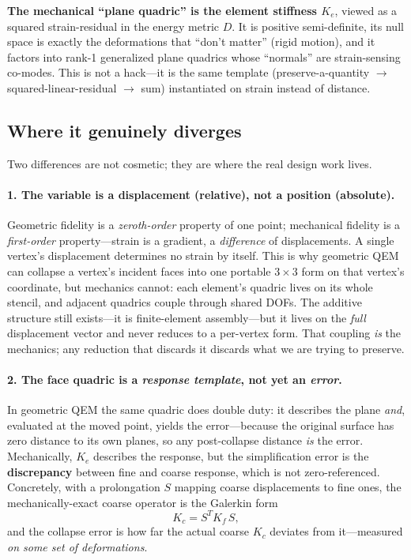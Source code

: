 \noindent\textbf{The mechanical ``plane quadric'' is the element stiffness $K_e$}, viewed as a squared strain-residual in the energy metric $D$.
It is positive semi-definite, its null space is exactly the deformations that ``don't matter'' (rigid motion), and it factors into rank-1 generalized plane quadrics whose ``normals'' are strain-sensing co-modes.
This is not a hack---it is the same template (preserve-a-quantity $\rightarrow$ squared-linear-residual $\rightarrow$ sum) instantiated on strain instead of distance.

\subsection{Where it genuinely diverges}

Two differences are not cosmetic; they are where the real design work lives.

\paragraph{1. The variable is a displacement (relative), not a position (absolute).}
Geometric fidelity is a \emph{zeroth-order} property of one point; mechanical fidelity is a \emph{first-order} property---strain is a gradient, a \emph{difference} of displacements.
A single vertex's displacement determines no strain by itself.
This is why geometric QEM can collapse a vertex's incident faces into one portable $3\times3$ form on that vertex's coordinate, but mechanics cannot: each element's quadric lives on its whole stencil, and adjacent quadrics couple through shared DOFs.
The additive structure still exists---it is finite-element assembly---but it lives on the \emph{full} displacement vector and never reduces to a per-vertex form.
That coupling \emph{is} the mechanics; any reduction that discards it discards what we are trying to preserve.

\paragraph{2. The face quadric is a \emph{response template}, not yet an \emph{error}.}
In geometric QEM the same quadric does double duty: it describes the plane \emph{and}, evaluated at the moved point, yields the error---because the original surface has zero distance to its own planes, so any post-collapse distance \emph{is} the error.
Mechanically, $K_e$ describes the response, but the simplification error is the \textbf{discrepancy} between fine and coarse response, which is not zero-referenced.
Concretely, with a prolongation $S$ mapping coarse displacements to fine ones, the mechanically-exact coarse operator is the Galerkin form
\begin{equation}
  K_c = S^T K_f\,S,
\end{equation}
and the collapse error is how far the actual coarse $K_c$ deviates from it---measured \emph{on some set of deformations}.

